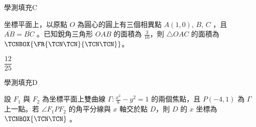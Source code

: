 \begin{QUESTIONS}
\begin{QUESTION}
\begin{QANS}
        \end{QANS}
        \begin{QSOLLIST}
        \end{QSOLLIST}
        \begin{QEMPTYSPACE}
        \end{QEMPTYSPACE}
    \end{QUESTION}
    \begin{QUESTION}
        \begin{ExamInfo}{97}{學測}{填充}{C}
        \end{ExamInfo}
        \begin{ExamAnsRateInfo}{19}{51}{6}{0}
        \end{ExamAnsRateInfo}
        \begin{QBODY}
            坐標平面上，以原點 $O$ 為圓心的圓上有三個相異點 $A(1, 0)$, $B$, $C$ ，且 $\overline{AB} = \overline{BC}$ 。已知銳角三角形 $OAB$ 的面積為 $\frac{3}{10}$，則 $\triangle OAC$ 的面積為 $\TCNBOX{\FR{\TCN\TCN}{\TCN\TCN}}$。
        \end{QBODY}
        \begin{QFROMS}
        \end{QFROMS}
        \begin{QTAGS}\end{QTAGS}
        \begin{QANS}
            $\dfrac{12}{25}$
        \end{QANS}
        \begin{QSOLLIST}
        \end{QSOLLIST}
        \begin{QEMPTYSPACE}
        \end{QEMPTYSPACE}
    \end{QUESTION}
    \begin{QUESTION}
        \begin{ExamInfo}{97}{學測}{填充}{D}
        \end{ExamInfo}
        \begin{ExamAnsRateInfo}{35}{72}{27}{6}
        \end{ExamAnsRateInfo}
        \begin{QBODY}
            設 $F_1$ 與 $F_2$ 為坐標平面上雙曲線 $\Gamma : \frac{x^2}{8} - y^2 =1$ 的兩個焦點，且 $P(-4,1)$ 為 $\Gamma$ 上一點。若 $\angle F_1PF_2$ 的角平分線與 $x$ 軸交於點 $D$，則 $D$ 的 $x$ 坐標為 
$\TCNBOX{\TCN\TCN}$ 。
        \end{QBODY}
        \begin{QFROMS}

\end{QFROMS}
\end{QUESTION}
\end{QUESTIONS}
